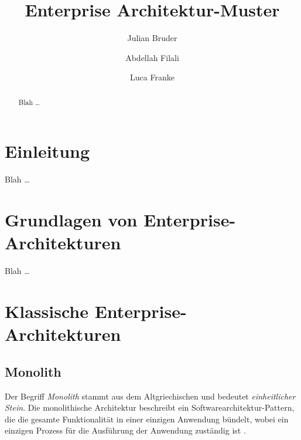 \documentclass[acmtog]{acmart}
\begin{document}
\title{Enterprise Architektur-Muster}

\author{Julian Bruder}
\author{Abdellah Filali}
\authornotemark[1]
\author{Luca Franke}
\authornotemark[1]
\renewcommand{\shortauthors}{Bruder, Filali, Franke}

\begin{abstract}
Blah \ldots
\end{abstract}

\maketitle

\section{Einleitung}
Blah \ldots

\section{Grundlagen von Enterprise-Architekturen}
Blah \ldots

\section{Klassische Enterprise-Architekturen}
\subsection{Monolith}
Der Begriff \textit{Monolith} stammt aus dem Altgriechischen und bedeutet \textit{einheitlicher Stein}.
Die monolithische Architektur beschreibt ein Softwarearchitektur-Pattern, die die gesamte Funktionalität
in einer einzigen Anwendung bündelt, wobei ein einzigen Prozess für die Ausführung der Anwendung zuständig ist \cite[1]{mono}.
\end{document}
